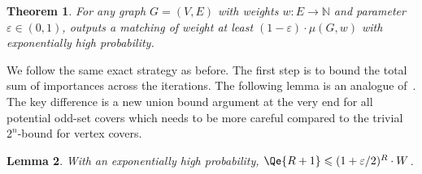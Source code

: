 \documentclass{article}
\newtheorem{theorem}{Theorem}\newtheorem{lemma}[theorem]{Lemma}\newtheorem{proposition}[theorem]{Proposition}\newtheorem{corollary}[theorem]{Corollary}\newtheorem{definition}[theorem]{Definition}\newtheorem{claim}[theorem]{Claim}\newtheorem{remark}[theorem]{Remark}\newtheorem{observation}[theorem]{Observation}\newtheorem{conjecture}[theorem]{Conjecture}\newtheorem{example}[theorem]{Example}
\renewcommand{\leq}{\leqslant}
\newcommand{\eps}{\varepsilon}
\newcommand{\IN}{\mathbb{N}}
\begin{document}
\begin{theorem}\label{thm:alg-general}
	For any graph $G=(V,E)$ with weights $w: E \rightarrow \IN$ and parameter $\eps \in (0,1)$,  outputs a matching of weight at least $(1-\eps) \cdot \mu(G,w)$ with exponentially high probability. 
\end{theorem}


We follow the same exact strategy as before. The first step is to bound the total sum of importances across the iterations. The following lemma
is an analogue of~. The key difference is a new union bound argument at the very end
for all potential odd-set covers which needs to be more careful compared to the trivial $2^n$-bound for vertex covers. 

\begin{lemma}\label{lem:Qr-small-general}
	With an exponentially high probability, $\Qe{R+1} \leq (1+\eps/2)^{R} \cdot W$.   
\end{lemma}
\end{document}

